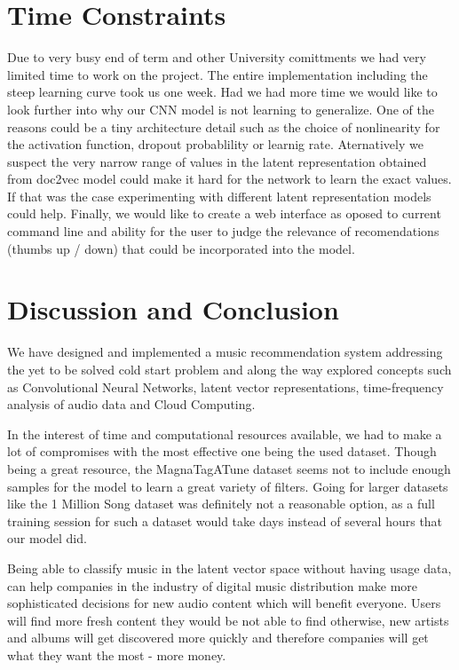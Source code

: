 \documentclass[11pt, a4paper]{article}
\begin{document}
  \section{Time Constraints}
    Due to very busy end of term and other University comittments we had very
    limited time to work on the project. The entire implementation including
    the steep learning curve took us one week. Had we had more time we would
    like to look further into why our CNN model is not learning to generalize.
    One of the reasons could be a tiny architecture detail such as the choice
    of nonlinearity for the activation function, dropout probablility or
    learnig rate. Aternatively we suspect the very narrow range of values in
    the latent representation obtained from doc2vec model could make it hard
    for the network to learn the exact values. If that was the case
    experimenting with different latent representation models could help.
    Finally, we would like to create a web interface as oposed to current
    command line and ability for the user to judge the relevance of
    recomendations (thumbs up / down) that could be incorporated into the
    model.
    
  \section{Discussion and Conclusion}
    We have designed and implemented a music recommendation system addressing
    the yet to be solved cold start problem and along the way explored concepts
    such as Convolutional Neural Networks, latent vector representations,
    time-frequency analysis of audio data and Cloud Computing.

    In the interest of time and computational resources available, we had to
    make a lot of compromises with the most effective one being the used
    dataset. Though being a great resource, the MagnaTagATune dataset seems not
    to include enough samples for the model to learn a great variety of
    filters. Going for larger datasets like the 1 Million Song dataset was
    definitely not a reasonable option, as a full training session for such a
    dataset would take days instead of several hours that our model did.

    Being able to classify music in the latent vector space without having
    usage data, can help companies in the industry of digital music
    distribution make more sophisticated decisions for new audio content which
    will benefit everyone. Users will find more fresh content they would be not
    able to find otherwise, new artists and albums will get discovered more
    quickly and therefore companies will get what they want the most - more
    money.
\end{document}
